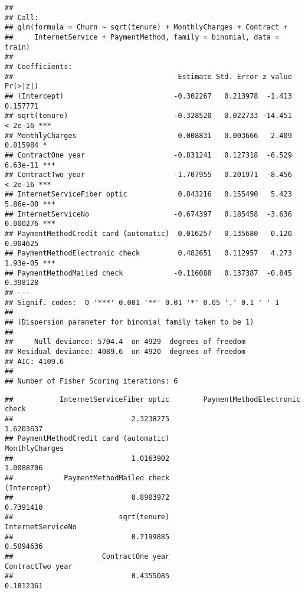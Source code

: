\documentclass[
]{article}
\newenvironment{Shaded}{\begin{snugshade}}{\end{snugshade}}
\newcommand{\AttributeTok}[1]{\textcolor[rgb]{0.13,0.29,0.53}{#1}}
\newcommand{\ConstantTok}[1]{\textcolor[rgb]{0.56,0.35,0.01}{#1}}
\newcommand{\FunctionTok}[1]{\textcolor[rgb]{0.13,0.29,0.53}{\textbf{#1}}}
\newcommand{\NormalTok}[1]{#1}
\newcommand{\SpecialCharTok}[1]{\textcolor[rgb]{0.81,0.36,0.00}{\textbf{#1}}}
\begin{document}
\begin{verbatim}
## 
## Call:
## glm(formula = Churn ~ sqrt(tenure) + MonthlyCharges + Contract + 
##     InternetService + PaymentMethod, family = binomial, data = train)
## 
## Coefficients:
##                                       Estimate Std. Error z value Pr(>|z|)    
## (Intercept)                          -0.302267   0.213978  -1.413 0.157771    
## sqrt(tenure)                         -0.328520   0.022733 -14.451  < 2e-16 ***
## MonthlyCharges                        0.008831   0.003666   2.409 0.015984 *  
## ContractOne year                     -0.831241   0.127318  -6.529 6.63e-11 ***
## ContractTwo year                     -1.707955   0.201971  -8.456  < 2e-16 ***
## InternetServiceFiber optic            0.843216   0.155490   5.423 5.86e-08 ***
## InternetServiceNo                    -0.674397   0.185458  -3.636 0.000276 ***
## PaymentMethodCredit card (automatic)  0.016257   0.135680   0.120 0.904625    
## PaymentMethodElectronic check         0.482651   0.112957   4.273 1.93e-05 ***
## PaymentMethodMailed check            -0.116088   0.137387  -0.845 0.398128    
## ---
## Signif. codes:  0 '***' 0.001 '**' 0.01 '*' 0.05 '.' 0.1 ' ' 1
## 
## (Dispersion parameter for binomial family taken to be 1)
## 
##     Null deviance: 5704.4  on 4929  degrees of freedom
## Residual deviance: 4089.6  on 4920  degrees of freedom
## AIC: 4109.6
## 
## Number of Fisher Scoring iterations: 6
\end{verbatim}

\begin{Shaded}
\end{Shaded}

\begin{verbatim}
##           InternetServiceFiber optic        PaymentMethodElectronic check 
##                            2.3238275                            1.6203637 
## PaymentMethodCredit card (automatic)                       MonthlyCharges 
##                            1.0163902                            1.0088706 
##            PaymentMethodMailed check                          (Intercept) 
##                            0.8903972                            0.7391410 
##                         sqrt(tenure)                    InternetServiceNo 
##                            0.7199885                            0.5094636 
##                     ContractOne year                     ContractTwo year 
##                            0.4355085                            0.1812361
\end{verbatim}
\end{document}
